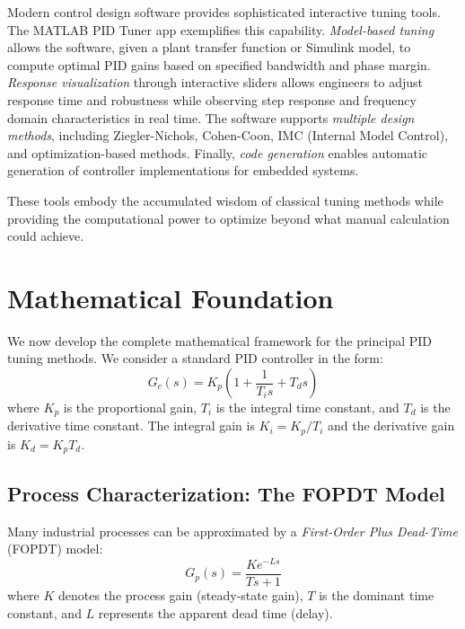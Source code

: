 Modern control design software provides sophisticated interactive tuning tools. The MATLAB PID Tuner app exemplifies this capability. \textit{Model-based tuning} allows the software, given a plant transfer function or Simulink model, to compute optimal PID gains based on specified bandwidth and phase margin. \textit{Response visualization} through interactive sliders allows engineers to adjust response time and robustness while observing step response and frequency domain characteristics in real time. The software supports \textit{multiple design methods}, including Ziegler-Nichols, Cohen-Coon, IMC (Internal Model Control), and optimization-based methods. Finally, \textit{code generation} enables automatic generation of controller implementations for embedded systems.

These tools embody the accumulated wisdom of classical tuning methods while providing the computational power to optimize beyond what manual calculation could achieve.


\section{Mathematical Foundation}
\label{sec:pid_tuning_math}

We now develop the complete mathematical framework for the principal PID tuning methods. We consider a standard PID controller in the form:
\begin{equation}
    G_c(s) = K_p\left(1 + \frac{1}{T_i s} + T_d s\right)
\end{equation}
where $K_p$ is the proportional gain, $T_i$ is the integral time constant, and $T_d$ is the derivative time constant. The integral gain is $K_i = K_p/T_i$ and the derivative gain is $K_d = K_p T_d$.

\subsection{Process Characterization: The FOPDT Model}

Many industrial processes can be approximated by a \textit{First-Order Plus Dead-Time} (FOPDT) model:
\begin{equation}
    G_p(s) = \frac{K e^{-Ls}}{Ts + 1}
    \label{eq:fopdt}
\end{equation}
where $K$ denotes the process gain (steady-state gain), $T$ is the dominant time constant, and $L$ represents the apparent dead time (delay).

